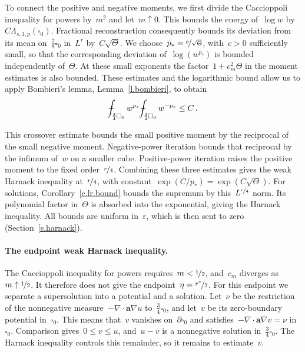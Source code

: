 \documentclass[11pt,letterpaper]{article}
\numberwithin{equation}{section}
\theoremstyle{definition}
\renewcommand{\a}{\mathbf{a}}
\newcommand{\eps}{\varepsilon}
\newcommand{\nf}{\nicefrac}
\newcommand{\cu}{\square}
\def\Xint#1{\mathchoice
	{\XXint\displaystyle\textstyle{#1}}%
	{\XXint\textstyle\scriptstyle{#1}}%
	{\XXint\scriptstyle\scriptscriptstyle{#1}}%
	{\XXint\scriptscriptstyle\scriptscriptstyle{#1}}%
	\!\int}
\def\XXint#1#2#3{{\setbox0=\hbox{$#1{#2#3}{\int}$}
		\vcenter{\hbox{$#2#3$}}\kern-.5\wd0}}
\def\fint{\Xint-}
\begin{document}
To connect the positive and negative moments, we first divide the Caccioppoli inequality for powers by~$m^2$ and let~$m\uparrow0$. This bounds the energy of~$\log w$ by~$C\Lambda_{s,1,p}(\cu_0)$. Fractional reconstruction consequently bounds its deviation from its mean on~$\frac78\cu_0$ in~$L^r$ by~$C\sqrt\Theta$. We choose~$p_*=\nf c{\sqrt\Theta}$, with~$c>0$ sufficiently small, so that the corresponding deviation of~$\log(w^{p_*})$ is bounded independently of~$\Theta$. At these small exponents the factor~$1+c_m^2\Theta$ in the moment estimates is also bounded. These estimates and the logarithmic bound allow us to apply Bombieri's lemma, Lemma~\ref{l.bombieri}, to obtain
\begin{equation*}
    \fint_{\frac34\cu_0}w^{p_*}
    \fint_{\frac34\cu_0}w^{-p_*}
    \leq C
    \,.
\end{equation*}

This crossover estimate bounds the small positive moment by the reciprocal of the small negative moment. Negative-power iteration bounds that reciprocal by the infimum of~$w$ on a smaller cube. Positive-power iteration raises the positive moment to the fixed order~$\nf r4$. Combining these three estimates gives the weak Harnack inequality at~$\nf r4$, with constant~$\exp(C/p_*)=\exp(C\sqrt\Theta)$. For solutions, Corollary~\ref{c.lr.bound} bounds the supremum by this~$L^{\nf r4}$ norm. Its polynomial factor in~$\Theta$ is absorbed into the exponential, giving the Harnack inequality. All bounds are uniform in~$\eps$, which is then sent to zero (Section~\ref{s.harnack}).

\paragraph{The endpoint weak Harnack inequality.} The Caccioppoli inequality for powers requires~$m<\nf12$, and~$c_m$ diverges as~$m\uparrow\nf12$. It therefore does not give the endpoint~$\eta=\nf{r^*}2$. For this endpoint we separate a supersolution into a potential and a solution. Let~$\nu$ be the restriction of the nonnegative measure~$-\nabla\cdot\a\nabla u$ to~$\frac34\cu_0$, and let~$v$ be its zero-boundary potential in~$\cu_0$. This means that~$v$ vanishes on~$\partial\cu_0$ and satisfies~$-\nabla\cdot\a\nabla v=\nu$ in~$\cu_0$. Comparison gives~$0\leq v\leq u$, and~$u-v$ is a nonnegative solution in~$\frac34\cu_0$. The Harnack inequality controls this remainder, so it remains to estimate~$v$.
\end{document}

